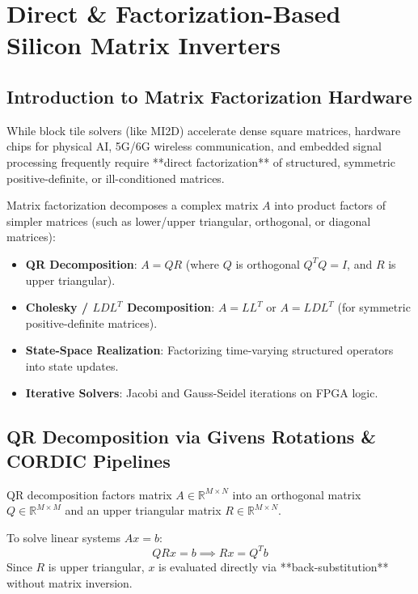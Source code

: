 \chapter{Direct \& Factorization-Based Silicon Matrix Inverters}
\label{ch:direct_solvers}

\section{Introduction to Matrix Factorization Hardware}
While block tile solvers (like MI2D) accelerate dense square matrices, hardware chips for physical AI, 5G/6G wireless communication, and embedded signal processing frequently require **direct factorization** of structured, symmetric positive-definite, or ill-conditioned matrices.

Matrix factorization decomposes a complex matrix $A$ into product factors of simpler matrices (such as lower/upper triangular, orthogonal, or diagonal matrices):
\begin{itemize}[leftmargin=*]
    \item \textbf{QR Decomposition}: $A = Q R$ (where $Q$ is orthogonal $Q^T Q = I$, and $R$ is upper triangular).
    \item \textbf{Cholesky / $L D L^T$ Decomposition}: $A = L L^T$ or $A = L D L^T$ (for symmetric positive-definite matrices).
    \item \textbf{State-Space Realization}: Factorizing time-varying structured operators into state updates.
    \item \textbf{Iterative Solvers}: Jacobi and Gauss-Seidel iterations on FPGA logic.
\end{itemize}

\section{QR Decomposition via Givens Rotations \& CORDIC Pipelines}
QR decomposition factors matrix $A \in \mathbb{R}^{M \times N}$ into an orthogonal matrix $Q \in \mathbb{R}^{M \times M}$ and an upper triangular matrix $R \in \mathbb{R}^{M \times N}$.

To solve linear systems $A x = b$:
\begin{equation}
Q R x = b \implies R x = Q^T b
\end{equation}
Since $R$ is upper triangular, $x$ is evaluated directly via **back-substitution** without matrix inversion.

